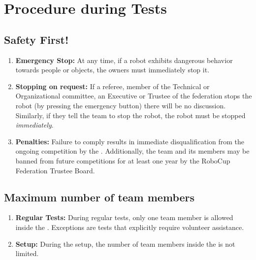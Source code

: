 \section{Procedure during Tests}

\subsection{Safety First!}\label{rule:safetyfirst}

\begin{enumerate}
	\item \textbf{Emergency Stop:} At any time, if a robot exhibits dangerous behavior towards people or objects, the owners must immediately stop it.
	\item \textbf{Stopping on request:} If a referee, member of the Technical or Organizational committee, an Executive or Trustee of the federation stops the robot (by pressing the emergency button) there will be no discussion. Similarly, if they tell the team to stop the robot, the robot must be stopped \emph{immediately}.
	\item \textbf{Penalties:} Failure to comply results in immediate disqualification from the ongoing competition by the \AtHome{} \TC{}. Additionally, the team and its members may be banned from future competitions for at least one year by the RoboCup Federation Trustee Board.
\end{enumerate}

\subsection{Maximum number of team members}\label{rule:number_of_people}

\begin{enumerate}
	\item \textbf{Regular Tests:} During regular tests, only one team member is allowed inside the \Arena{}.
	Exceptions are tests that explicitly require volunteer assistance.
	\item \textbf{Setup:} During the setup, the number of team members inside the \Arena{} is not limited.
\end{enumerate}

